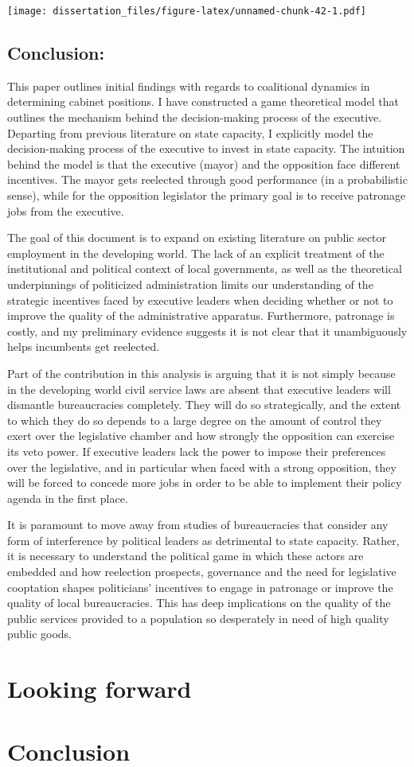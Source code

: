 \documentclass[12pt,]{book}
\begin{document}
\texttt{[image: dissertation\_files/figure-latex/unnamed-chunk-42-1.pdf]}

\hypertarget{conclusion}{%
\section{Conclusion:}\label{conclusion}}

This paper outlines initial findings with regards to coalitional dynamics in determining cabinet positions. I have constructed a game theoretical model that outlines the mechanism behind the decision-making process of the executive. Departing from previous literature on state capacity, I explicitly model the decision-making process of the executive to invest in state capacity. The intuition behind the model is that the executive (mayor) and the opposition face different incentives. The mayor gets reelected through good performance (in a probabilistic sense), while for the opposition legislator the primary goal is to receive patronage jobs from the executive.

The goal of this document is to expand on existing literature on public sector employment in the developing world. The lack of an explicit treatment of the institutional and political context of local governments, as well as the theoretical underpinnings of politicized administration limits our understanding of the strategic incentives faced by executive leaders when deciding whether or not to improve the quality of the administrative apparatus. Furthermore, patronage is costly, and my preliminary evidence suggests it is not clear that it unambiguously helps incumbents get reelected.

Part of the contribution in this analysis is arguing that it is not simply because in the developing world civil service laws are absent that executive leaders will dismantle bureaucracies completely. They will do so strategically, and the extent to which they do so depends to a large degree on the amount of control they exert over the legislative chamber and how strongly the opposition can exercise its veto power. If executive leaders lack the power to impose their preferences over the legislative, and in particular when faced with a strong opposition, they will be forced to concede more jobs in order to be able to implement their policy agenda in the first place.

It is paramount to move away from studies of bureaucracies that consider any form of interference by political leaders as detrimental to state capacity. Rather, it is necessary to understand the political game in which these actors are embedded and how reelection prospects, governance and the need for legislative cooptation shapes politicians' incentives to engage in patronage or improve the quality of local bureaucracies. This has deep implications on the quality of the public services provided to a population so desperately in need of high quality public goods.

\hypertarget{looking-forward}{%
\chapter{Looking forward}\label{looking-forward}}

\hypertarget{conclusion-1}{%
\chapter{Conclusion}\label{conclusion-1}}


\end{document}
